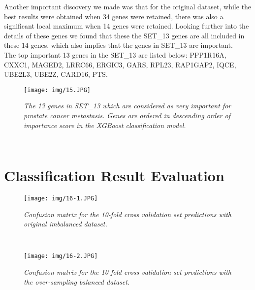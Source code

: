 \documentclass[12pt,a4paper]{report}
\begin{document}
Another important discovery we made was that for the original dataset, while the best results were obtained when 34 genes were retained, there was also a significant local maximum when 14 genes were retained. Looking further into the details of these genes we found that these the SET\_13 genes are all included in these 14 genes, which also implies that the genes in SET\_13 are important.\\

The top important 13 genes in the SET\_13 are listed below:
PPP1R16A, CXXC1, MAGED2, LRRC66, ERGIC3, GARS, RPL23, RAP1GAP2, IQCE, UBE2L3, UBE2Z, CARD16, PTS.\\


\begin{figure}[h!]
\centering
\texttt{[image: img/15.JPG]}
\caption{\textit{The 13 genes in SET\_13 which are considered as very important for prostate cancer metastasis. Genes are ordered in descending order of importance score in the XGBoost classification model.}}
\label{fig:top13}
\end{figure}\\


\section{Classification Result Evaluation}



\begin{figure}[h!]
\centering
\texttt{[image: img/16-1.JPG]}
\caption{\textit{Confusion matrix for the 10-fold cross validation set predictions with original imbalanced dataset.}}
\label{fig:oriconfnx}
\end{figure}\\


\begin{figure}[h!]
\centering
\texttt{[image: img/16-2.JPG]}
\caption{\textit{Confusion matrix for the 10-fold cross validation set predictions with the over-sampling balanced dataset.}}
\label{fig:balconfnx}
\end{figure}\\
\end{document}
